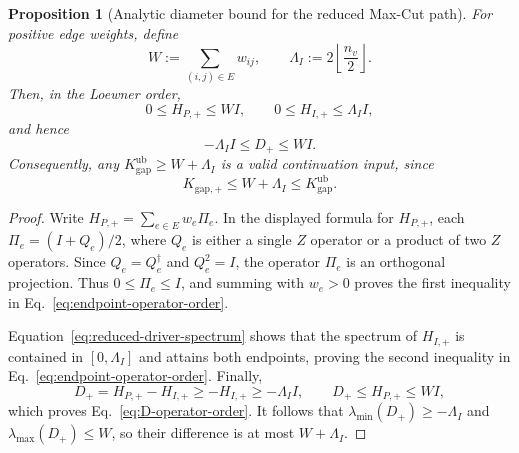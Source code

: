 \documentclass[11pt, a4paper]{article}
\newtheorem{proposition}[theorem]{Proposition}
\begin{document}
\begin{proposition}[Analytic diameter bound for the reduced Max-Cut path]
\label{prop:computational-diameter-bound}
For positive edge weights, define
\begin{equation}
W:=\sum_{(i,j)\in E}w_{ij},
\qquad
\Lambda_I:=2\left\lfloor\frac{n_v}{2}\right\rfloor.
\end{equation}
Then, in the Loewner order,
\begin{equation}
\label{eq:endpoint-operator-order}
0\le H_{P,+}\le WI,
\qquad
0\le H_{I,+}\le\Lambda_I I,
\end{equation}
and hence
\begin{equation}
\label{eq:D-operator-order}
-\Lambda_I I\le D_+\le WI.
\end{equation}
Consequently, any $K_{\mathrm{gap}}^{\mathrm{ub}}\ge W+\Lambda_I$ is a valid continuation input, since
\begin{equation}
\label{eq:computational-gap-bounds}
K_{\mathrm{gap},+}\le W+\Lambda_I\le K_{\mathrm{gap}}^{\mathrm{ub}}.
\end{equation}
\end{proposition}

\begin{proof}
Write $H_{P,+}=\sum_{e\in E}w_e\Pi_e$. In the displayed formula for $H_{P,+}$, each $\Pi_e=(I+Q_e)/2$, where $Q_e$ is either a single $Z$ operator or a product of two $Z$ operators. Since $Q_e=Q_e^\dagger$ and $Q_e^2=I$, the operator $\Pi_e$ is an orthogonal projection. Thus $0\le\Pi_e\le I$, and summing with $w_e>0$ proves the first inequality in Eq.~\eqref{eq:endpoint-operator-order}.

Equation~\eqref{eq:reduced-driver-spectrum} shows that the spectrum of $H_{I,+}$ is contained in $[0,\Lambda_I]$ and attains both endpoints, proving the second inequality in Eq.~\eqref{eq:endpoint-operator-order}. Finally,
\begin{equation}
D_+=H_{P,+}-H_{I,+}\ge-H_{I,+}\ge-\Lambda_I I,
\qquad
D_+\le H_{P,+}\le WI,
\end{equation}
which proves Eq.~\eqref{eq:D-operator-order}. It follows that $\lambda_{\min}(D_+)\ge-\Lambda_I$ and $\lambda_{\max}(D_+)\le W$, so their difference is at most $W+\Lambda_I$.
\end{proof}
\end{document}
